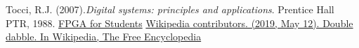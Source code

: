 \documentclass[a4paper]{article}
\begin{document}
\begin{thebibliography}{80}


 Tocci, R.J. (2007).\textit{Digital systems: principles and applications}.	Prentice Hall PTR, 1988.
 \href{https://www.fpga4student.com/2017/09/verilog-code-for-moore-fsm-sequence-detector.html}{FPGA for Students}
 \href{https://en.wikipedia.org/wiki/Double_dabble}{Wikipedia contributors. (2019, May 12). Double dabble. In Wikipedia, The Free Encyclopedia}
\end{thebibliography}
\end{document}
